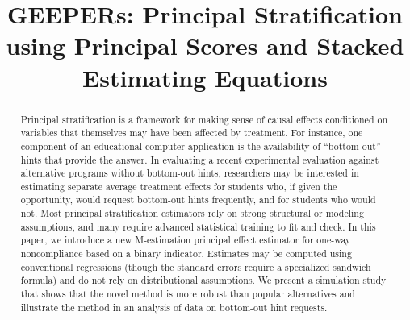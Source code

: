 \documentclass[]{article}
\begin{document}



\title{GEEPERs: Principal Stratification using Principal Scores and Stacked Estimating Equations}




\begin{abstract}
Principal stratification is a framework for making sense of causal effects conditioned on variables that themselves may have been affected by treatment. For instance, one component of an educational computer application is the availability of “bottom-out” hints that provide the answer. In evaluating a recent experimental evaluation against alternative programs without bottom-out hints, researchers may be interested in estimating separate average treatment effects for students who, if given the opportunity, would request bottom-out hints frequently, and for students who would not. Most principal stratification estimators rely on strong structural or modeling assumptions, and many require advanced statistical training to fit and check. In this paper, we introduce a new M-estimation principal effect estimator for one-way noncompliance based on a binary indicator. Estimates may be computed using conventional regressions (though the standard errors require a specialized sandwich formula) and do not rely on distributional assumptions. We present a simulation study that shows that the novel method is more robust than popular alternatives and illustrate the method in an analysis of data on bottom-out hint requests.
\end{abstract}
\end{document}
